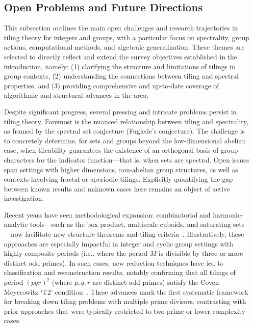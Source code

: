 \documentclass[sigconf]{acmart}
\begin{document}
\subsection{Open Problems and Future Directions}

This subsection outlines the main open challenges and research trajectories in tiling theory for integers and groups, with a particular focus on spectrality, group actions, computational methods, and algebraic generalization. These themes are selected to directly reflect and extend the survey objectives established in the introduction, namely: (1) clarifying the structure and limitations of tilings in group contexts, (2) understanding the connections between tiling and spectral properties, and (3) providing comprehensive and up-to-date coverage of algorithmic and structural advances in the area.

Despite significant progress, several pressing and intricate problems persist in tiling theory. Foremost is the nuanced relationship between tiling and spectrality, as framed by the spectral set conjecture (Fuglede’s conjecture). The challenge is to concretely determine, for sets and groups beyond the low-dimensional abelian case, when tileability guarantees the existence of an orthogonal basis of group characters for the indicator function—that is, when sets are spectral. Open issues span settings with higher dimensions, non-abelian group structures, as well as contexts involving fractal or aperiodic tilings. Explicitly quantifying the gap between known results and unknown cases here remains an object of active investigation.

Recent years have seen methodological expansion: combinatorial and harmonic-analytic tools—such as the box product, multiscale cuboids, and saturating sets—now facilitate new structure theorems and tiling criteria~\cite{ref101}. Illustratively, these approaches are especially impactful in integer and cyclic group settings with highly composite periods (i.e., where the period $M$ is divisible by three or more distinct odd primes). In such cases, new reduction techniques have led to classification and reconstruction results, notably confirming that all tilings of period $(pqr)^2$ (where $p,q,r$ are distinct odd primes) satisfy the Coven-Meyerowitz ‘T2’ condition~\cite{ref101}. These advances mark the first systematic framework for breaking down tiling problems with multiple prime divisors, contrasting with prior approaches that were typically restricted to two-prime or lower-complexity cases.
\end{document}
